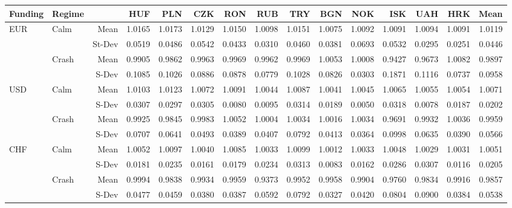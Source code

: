 \documentclass[12pt, a4paper, oneside]{article}\usepackage[]{graphicx}\usepackage[]{color}
\begin{document}
\begin{landscape}
\begin{table}[ht]
\begin{threeparttable}
\centering
\begin{tabular}{llrrrrrrrrrrrrr}
  \hline
 Funding & Regime& & HUF & PLN & CZK & RON & RUB & TRY & BGN & NOK & ISK & UAH & HRK & Mean \\ 
  \hline
  \hline
\multirow{4}{*}{EUR}& \multirow{2}{*}{Calm}& Mean & 1.0165 & 1.0173 & 1.0129 & 1.0150 & 1.0098 & 1.0151 & 1.0075 & 1.0092 & 1.0091 & 1.0094 & 1.0091 & 1.0119 \\ 
&&St-Dev& 0.0519 & 0.0486 & 0.0542 & 0.0433 & 0.0310 & 0.0460 & 0.0381 & 0.0693 & 0.0532 & 0.0295 & 0.0251 & 0.0446 \\ 
&\multirow{2}{*}{Crash}& Mean & 0.9905 & 0.9862 & 0.9963 & 0.9969 & 0.9962 & 0.9969 & 1.0053 & 1.0008 & 0.9427 & 0.9673 & 1.0082 & 0.9897 \\ 
 &&S-Dev & 0.1085 & 0.1026 & 0.0886 & 0.0878 & 0.0779 & 0.1028 & 0.0826 & 0.0303 & 0.1871 & 0.1116 & 0.0737 & 0.0958 \\ 
\hline
\multirow{4}{*}{USD}&\multirow{2}{*}{Calm}&Mean& 1.0103 & 1.0123 & 1.0072 & 1.0091 & 1.0044 & 1.0087 & 1.0041 & 1.0045 & 1.0065 & 1.0055 & 1.0054 & 1.0071 \\ 
&&S-Dev& 0.0307 & 0.0297 & 0.0305 & 0.0080 & 0.0095 & 0.0314 & 0.0189 & 0.0050 & 0.0318 & 0.0078 & 0.0187 & 0.0202 \\ 
  &\multirow{2}{*}{Crash}&Mean& 0.9925 & 0.9845 & 0.9983 & 1.0052 & 1.0004 & 1.0034 & 1.0016 & 1.0034 & 0.9691 & 0.9932 & 1.0036 & 0.9959 \\ 
   & & S-Dev & 0.0707 & 0.0641 & 0.0493 & 0.0389 & 0.0407 & 0.0792 & 0.0413 & 0.0364 & 0.0998 & 0.0635 & 0.0390 & 0.0566 \\ 
\hline
\multirow{4}{*}{CHF}& \multirow{2}{*}{Calm}&Mean& 1.0052 & 1.0097 & 1.0040 & 1.0085 & 1.0033 & 1.0099 & 1.0012 & 1.0033 & 1.0048 & 1.0029 & 1.0031 & 1.0051 \\ 
   & & S-Dev & 0.0181 & 0.0235 & 0.0161 & 0.0179 & 0.0234 & 0.0313 & 0.0083 & 0.0162 & 0.0286 & 0.0307 & 0.0116 & 0.0205 \\ 
   & \multirow{2}{*}{Crash}& Mean & 0.9994 & 0.9838 & 0.9934 & 0.9959 & 0.9373 & 0.9952 & 0.9958 & 0.9904 & 0.9760 & 0.9834 & 0.9916 & 0.9857 \\ 
  & & S-Dev & 0.0477 & 0.0459 & 0.0380 & 0.0387 & 0.0592 & 0.0792 & 0.0327 & 0.0420 & 0.0804 & 0.0900 & 0.0384 & 0.0538 \\ 

\end{tabular}
\end{threeparttable}
\end{table}
\end{landscape}
\end{document}
